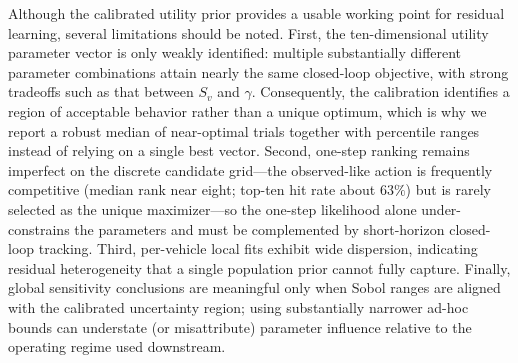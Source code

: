 Although the calibrated utility prior provides a usable working point for residual learning, several limitations should be noted. First, the ten-dimensional utility parameter vector is only weakly identified: multiple substantially different parameter combinations attain nearly the same closed-loop objective, with strong tradeoffs such as that between \(S_v\) and \(\gamma\). Consequently, the calibration identifies a region of acceptable behavior rather than a unique optimum, which is why we report a robust median of near-optimal trials together with percentile ranges instead of relying on a single best vector. Second, one-step ranking remains imperfect on the discrete candidate grid---the observed-like action is frequently competitive (median rank near eight; top-ten hit rate about \(63\%\)) but is rarely selected as the unique maximizer---so the one-step likelihood alone under-constrains the parameters and must be complemented by short-horizon closed-loop tracking. Third, per-vehicle local fits exhibit wide dispersion, indicating residual heterogeneity that a single population prior cannot fully capture. Finally, global sensitivity conclusions are meaningful only when Sobol ranges are aligned with the calibrated uncertainty region; using substantially narrower ad-hoc bounds can understate (or misattribute) parameter influence relative to the operating regime used downstream.
